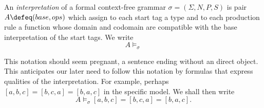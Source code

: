 
\begin{definition}
    An \emph{interpretation} of a formal context-free grammar $\sigma=(\Sigma,N,P,S)$ 
    is pair $A\defeq (base,ops)$ which assign to each start tag a type and 
    to each production rule a function whose domain and codomain are compatible 
    with the base interpretation of the start tags.  We write 
    \[ 
        A\vDash_{\sigma}
    \]
\end{definition}

This notation should seem pregnant, a sentence ending without an direct object.
This anticipates our later need to follow this notation by formulas that express qualities of 
the interpretation.  For example, perhaps $[a,b,c]=[b,c,a]=[b,a,c]$ in the specific 
model.  We shall then write     
\[ 
    A\vDash_{\sigma} [a,b,c]=[b,c,a]=[b,a,c].
\]

